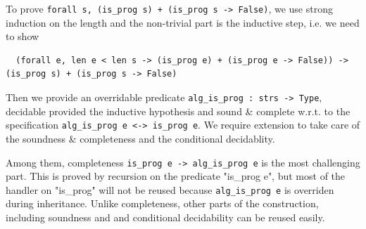 To prove \texttt{forall s, (is_prog s) + (is_prog s -> False)}, we use strong induction on the length and the non-trivial part is  the inductive step, i.e. we need to show
\begin{verbatim}
  (forall e, len e < len s -> (is_prog e) + (is_prog e -> False)) -> (is_prog s) + (is_prog s -> False)
\end{verbatim}


Then we provide an overridable predicate \texttt{alg_is_prog : strs -> Type}, decidable provided the inductive hypothesis and sound \& complete w.r.t. to the specification \texttt{alg_is_prog e  <-> is_prog e}. We require extension to take care of the soundness \& completeness and the conditional decidablity.

Among them, completeness \texttt{is_prog e -> alg_is_prog e} is the most challenging part. This is proved by recursion on the predicate "is_prog e", but most of the handler on "is_prog" will not be reused because \texttt{alg_is_prog e} is overriden during inheritance. Unlike completeness, other parts of the construction, including soundness and and conditional decidability can be reused easily.

